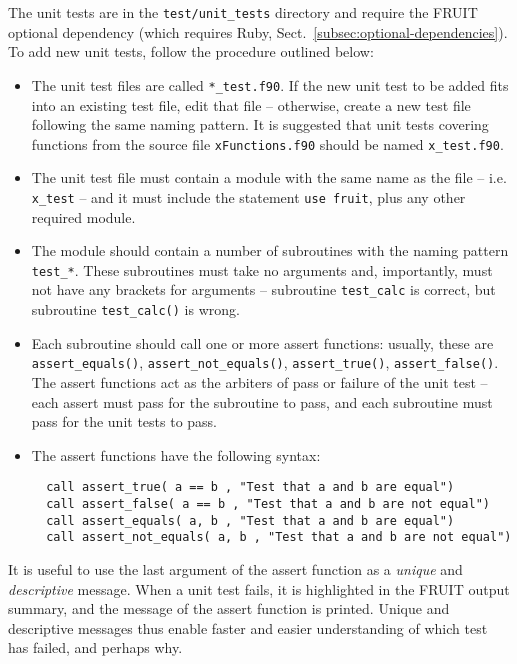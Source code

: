 The unit tests are in the \texttt{test/unit\_tests} directory and
require the FRUIT optional dependency (which requires Ruby,
Sect.~\ref{subsec:optional-dependencies}). To add new unit tests,
follow the procedure outlined below:

\begin{itemize}
\item The unit test files are called \texttt{*\_test.f90}. If the new
  unit test to be added fits into an existing test file, edit that
  file -- otherwise, create a new test file following the same naming
  pattern. It is suggested that unit tests covering functions from the
  source file \texttt{xFunctions.f90} should be named
  \texttt{x\_test.f90}.
\item The unit test file must contain a module with the same name as
  the file -- i.e. \texttt{x\_test} -- and it must include the
  statement \verb|use fruit|, plus any other required module.
\item The module should contain a number of subroutines with the
  naming pattern \texttt{test\_*}. These subroutines must take no
  arguments and, importantly, must not have any brackets for arguments
  -- subroutine \texttt{test\_calc} is correct, but subroutine
  \texttt{test\_calc()} is wrong.
\item Each subroutine should call one or more assert functions:
  usually, these are \texttt{assert\_equals()}, \texttt{assert\_not\_equals()},
  \texttt{assert\_true()}, \texttt{assert\_false()}. The assert functions
  act as the arbiters of pass or failure of the unit test -- each
  assert must pass for the subroutine to pass, and each subroutine
  must pass for the unit tests to pass.
\item The assert functions have the following syntax:
  \begin{verbatim}
  call assert_true( a == b , "Test that a and b are equal")
  call assert_false( a == b , "Test that a and b are not equal")
  call assert_equals( a, b , "Test that a and b are equal")
  call assert_not_equals( a, b , "Test that a and b are not equal")
  \end{verbatim}
\end{itemize}

It is useful to use the last argument of the assert function as a
\emph{unique} and \emph{descriptive} message. When a unit test fails,
it is highlighted in the FRUIT output summary, and the message of the
assert function is printed. Unique and descriptive messages thus
enable faster and easier understanding of which test has failed, and
perhaps why.

